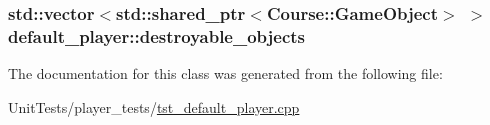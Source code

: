 \hypertarget{classdefault__player_acced0c01b21012d4e52e3326c28633aa}{
\subsubsection[{destroyable\-\_\-objects}]{\setlength{\rightskip}{0pt plus 5cm}std\-::vector$<$std\-::shared\-\_\-ptr$<${\bf Course\-::\-Game\-Object}$>$ $>$ default\-\_\-player\-::destroyable\-\_\-objects\hspace{0.3cm}{\ttfamily [private]}}}\label{classdefault__player_acced0c01b21012d4e52e3326c28633aa}


The documentation for this class was generated from the following file\-:\begin{DoxyCompactItemize}
\item 
Unit\-Tests/player\-\_\-tests/\hyperlink{tst__default__player_8cpp}{tst\-\_\-default\-\_\-player.\-cpp}\end{DoxyCompactItemize}
